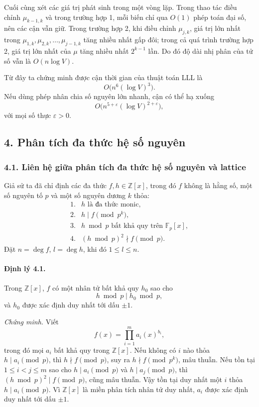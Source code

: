 \documentclass[11pt]{article}
\begin{document}
Cuối cùng xét các giá trị phát sinh trong một vòng lặp. Trong thao tác điều
chỉnh \(\mu_{k-1,k}\) và trong trường hợp 1, mỗi biến chỉ qua \(O(1)\) phép
toán đại số, nên các cận vẫn giữ. Trong trường hợp 2, khi điều chỉnh
\(\mu_{j,k}\), giá trị lớn nhất trong \(\mu_{1,k},\mu_{2,k},\ldots,\mu_{j-1,k}\)
tăng nhiều nhất gấp đôi; trong cả quá trình trường hợp 2, giá trị lớn nhất của
\(\mu\) tăng nhiều nhất \(2^{k-1}\) lần. Do đó độ dài nhị phân của tử số vẫn là
\(O(n\log V)\).

Từ đây ta chứng minh được cận thời gian của thuật toán LLL là
\[
  O\bigl(n^6(\log V)^3\bigr).
\]
Nếu dùng phép nhân chia số nguyên lớn nhanh, cận có thể hạ xuống
\[
  O\bigl(n^{5+\varepsilon}(\log V)^{2+\varepsilon}\bigr),
\]
với mọi số thực \(\varepsilon>0\).

\subsection*{4. Phân tích đa thức hệ số nguyên}

\subsubsection*{4.1. Liên hệ giữa phân tích đa thức hệ số nguyên và lattice}

Giả sử ta đã chỉ định các đa thức \(f,h\in\mathbb Z[x]\), trong đó \(f\) không
là hằng số, một số nguyên tố \(p\) và một số nguyên dương \(k\) thỏa:
\[
\begin{array}{ll}
1.& h \text{ là đa thức monic},\\
2.& h\mid f\pmod {p^k},\\
3.& h\bmod p \text{ bất khả quy trên } \mathbb F_p[x],\\
4.& (h\bmod p)^2\nmid f\pmod p.
\end{array}
\]
Đặt \(n=\deg f\), \(l=\deg h\), khi đó \(1\le l\le n\).

\paragraph{Định lý 4.1.}
Trong \(\mathbb Z[x]\), \(f\) có một nhân tử bất khả quy \(h_0\) sao cho
\[
  h\bmod p \mid h_0\bmod p,
\]
và \(h_0\) được xác định duy nhất tới dấu \(\pm1\).

\emph{Chứng minh.}
Viết
\[
  f(x)=\prod_{i=1}^{m}a_i(x)^{b_i},
\]
trong đó mọi \(a_i\) bất khả quy trong \(\mathbb Z[x]\). Nếu không có \(i\)
nào thỏa \(h\mid a_i\pmod p\), thì \(h\nmid f\pmod p\), suy ra
\(h\nmid f\pmod {p^k}\), mâu thuẫn. Nếu tồn tại \(1\le i<j\le m\) sao cho
\(h\mid a_i\pmod p\) và \(h\mid a_j\pmod p\), thì
\((h\bmod p)^2\mid f\pmod p\), cũng mâu thuẫn. Vậy tồn tại duy nhất một
\(i\) thỏa \(h\mid a_i\pmod p\). Vì \(\mathbb Z[x]\) là miền phân tích nhân tử
duy nhất, \(a_i\) được xác định duy nhất tới dấu \(\pm1\).
\end{document}
